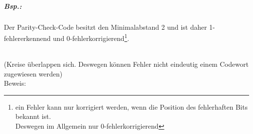 \subparagraph{Bsp.:} Der Parity-Check-Code besitzt den Minimalabstand 2 und ist daher 1-fehlererkennend und 0-fehlerkorrigierend\footnote{ein Fehler kann nur korrigiert werden, wenn die Position des fehlerhaften Bits bekannt ist. \\
Deswegen im Allgemein nur 0-fehlerkorrigierend}.\\
\\
(Kreise überlappen sich. Deswegen können Fehler nicht eindeutig einem Codewort zugewiesen werden)\\
Beweis:
